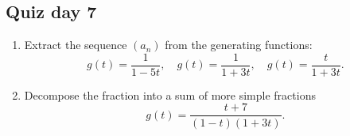 \documentclass[12pt]{article}
\begin{document}


\subsection*{Quiz day 7}

\begin{enumerate} 
    \item Extract the sequence $(a_n)$ from the generating functions:
    \[
    g(t) = \frac{1}{1 - 5t}, \quad g(t) = \frac{1}{1 + 3t}, \quad g(t) = \frac{t}{1 + 3t}.
    \]
    \item Decompose the fraction into a sum of more simple fractions
    \[
    g(t) = \frac{t + 7}{(1-t)(1+3t)}.
    \]
\end{enumerate}
\end{document}
